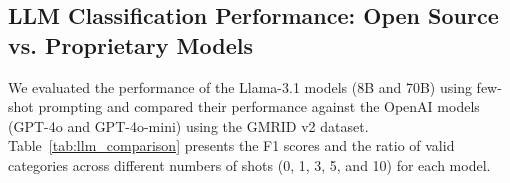 \subsection{LLM Classification Performance: Open Source vs. Proprietary Models}

We evaluated the performance of the Llama-3.1 models (8B and 70B) using few-shot prompting and compared their performance against the OpenAI models (GPT-4o and GPT-4o-mini) using the GMRID v2 dataset. Table~\ref{tab:llm_comparison} presents the F1 scores and the ratio of valid categories across different numbers of shots (0, 1, 3, 5, and 10) for each model.

\begin{table}[ht]
\caption{Comprehensive Performance Comparison of Llama-3.1 Models (8B and 70B) and OpenAI Models (GPT-4o-mini and GPT-4o) Across Different Few-Shot Prompting Scenarios. This table presents both F1 scores and Ratio of Valid Categories (RVC) for each model under varying numbers of shots. The the best performance for each model highlighted in bold.}
\centering
\renewcommand{\arraystretch}{1.2}
\label{tab:llm_comparison}
\end{table}

